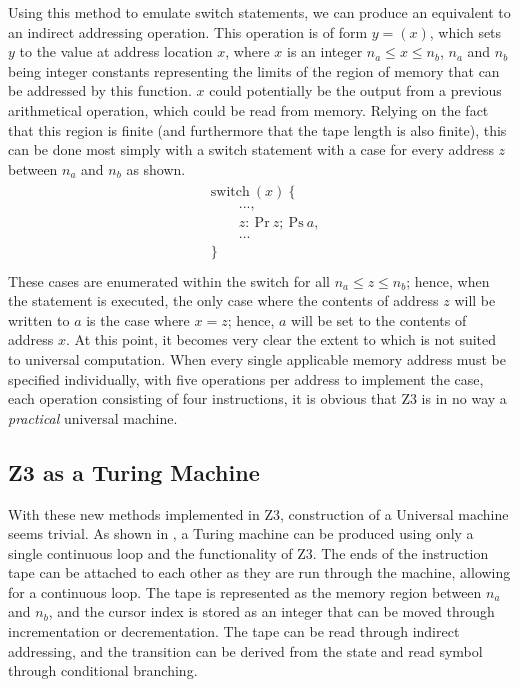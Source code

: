 \documentclass[Master.tex]{subfiles}
\begin{document}
Using this method to emulate switch statements, we can produce an equivalent to an indirect addressing operation. This operation is of form $y = (x)$, which sets $y$ to the value at address location $x$, where $x$ is an integer $n_a \leq x \leq n_b$, $n_a$ and $n_b$ being integer constants representing the limits of the region of memory that can be addressed by this function. $x$ could potentially be the output from a previous arithmetical operation, which could be read from memory. Relying on the fact that this region is finite (and furthermore that the tape length is also finite), this can be done most simply with a switch statement with a case for every address $z$ between $n_a$ and $n_b$ as shown.
\begin{gather*}
\begin{aligned}
&\bm{\mathrm{switch}}\ (x)\ \{              	\\
&\qquad ... ,                                   \\
&\qquad z:\	\mathrm{Pr}\ z;\ \mathrm{Ps}\ a,    \\
&\qquad ... 					                \\
&\}							                    \\
\end{aligned}
\end{gather*}
These cases are enumerated within the switch for all $n_a \leq z \leq n_b$; hence, when the statement is executed, the only case where the contents of address $z$ will be written to $a$ is the case where $x=z$; hence, $a$ will be set to the contents of address $x$.
At this point, it becomes very clear the extent to which  is not suited to universal computation. When every single applicable memory address must be specified individually, with five operations per address to implement the case, each operation consisting of four instructions, it is obvious that Z3 is in no way a \textit{practical} universal machine.

\subsection{Z3 as a Turing Machine}

With these new methods implemented in Z3, construction of a Universal machine seems trivial. As shown in \cite{harel1980folk}, a Turing machine can be produced using only a single continuous loop and the functionality of Z3. The ends of the instruction tape can be attached to each other as they are run through the machine, allowing for a continuous loop. The tape is represented as the memory region between $n_a$ and $n_b$, and the cursor index is stored as an integer that can be moved through incrementation or decrementation. The tape can be read through indirect addressing, and the transition can be derived from the state and read symbol through conditional branching.
\end{document}
